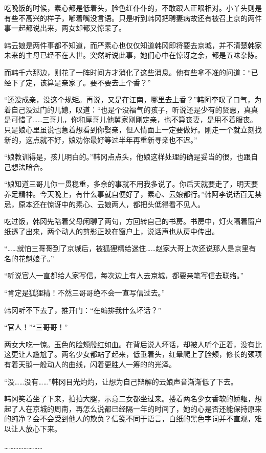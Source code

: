 吃晚饭的时候，素心都是低着头，脸色红仆仆的，不敢跟人正眼相对。小丫头则是有些不高兴的样子，嘟着嘴没言语。只是听到韩冈把聘妻病故还有被召上京的两件事一起都说出来，两女却都又惊呆了。

韩云娘是两件事都不知道，而严素心也仅仅知道韩冈即将要去京城，并不清楚韩家未来的主母已经不在人世。突然听说此事，她们心中在惊讶之余，都是五味杂陈。

而韩千六那边，则花了一阵时间方才消化了这些消息。他有些拿不准的问道：“已经下了定，该算是亲家了。要不要去上个香？”

“还没成亲，没这个规矩。再说，又是在江南，哪里去上香？”韩阿李叹了口气，为着自己没过门的儿媳，叹道：“也是个没福气的孩子，听说还是少有的贤惠，真真是可惜了……三哥儿，你和厚哥儿他舅家刚刚定亲，也不算丧妻，是用不着服丧。只是娘心里虽说也急着想看到你娶亲，但人情面上一定要做好。刚走一个就立刻找新的，这点就不好，娘劝你最好等过半年再重新寻亲也不迟。”

“娘教训得是，孩儿明白的。”韩冈点点头，他娘这样处理的确是妥当的很，也跟自己想法暗合。

“娘知道三哥儿你一贯稳重，多余的事就不用我多说了。你后天就要走了，明天要养足精神。今天晚上，有什么事就自便好了，素心、云娘都行。”韩阿李说话百无禁忌，原本还在惊讶中的素心、云娘两人，都把头低得看不见人。

吃过饭，韩冈先陪着父母闲聊了两句，方回转自己的书房。书房中，灯火隔着窗户纸透了出来，两个动人的剪影正映在窗户上，说话声也从房中传出。

“……就怕三哥哥到了京城后，被狐狸精给迷住……赵家大哥上次还说那人是京里有名的花魁娘子。”

“听说官人一直都给人家写信，每次边上有人去京城，都要亲笔写信去联络。”

“肯定是狐狸精！不然三哥哥绝不会一直写信过去。”

韩冈听不下去了，推开门：“在编排我什么坏话？”

“官人！”“三哥哥！”

两女大吃一惊。玉色的脸颊殷红如血。在背后说人坏话，却被人听个正着，没有比这更让人尴尬了。两名少女都站了起来，低垂着头，红晕爬上了脸颊，修长的颈项有着天鹅一般动人的曲线，闪着更胜人一筹的的光泽。

“没……没有……”韩冈目光灼灼，让想为自己辩解的云娘声音渐渐低了下去。

韩冈笑着坐了下来，拍拍大腿，示意二女都坐过来。搂着两名少女香软的娇躯，想起了人在京城的周南，再怎么说都已经隔一年的时间了，她的心是否还能保持原来的纯净？会不会受到他人的欺负？信笺不同于语言，白纸的黑色字词并不直观，难以让人放心下来。

……………………

